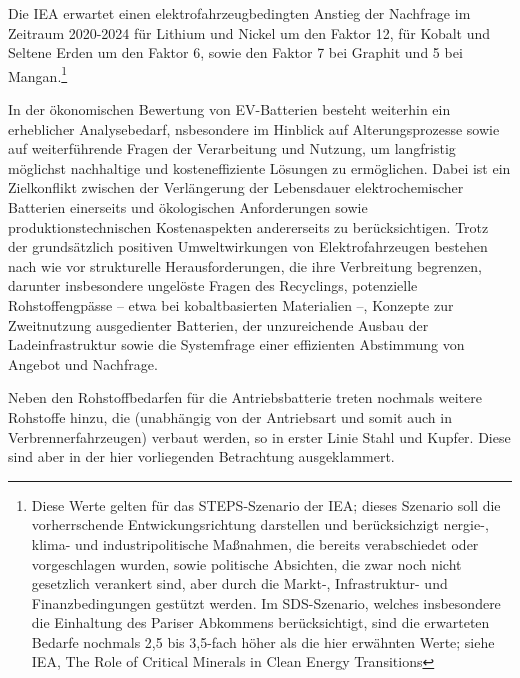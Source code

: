 \documentclass[12pt,a4paper,oneside]{book} %
\begin{document}
{{ 
 Die IEA erwartet einen elektrofahrzeugbedingten Anstieg der Nachfrage im Zeitraum 2020-2024 für Lithium und Nickel um den Faktor 12, für Kobalt und Seltene Erden um den Faktor 6, sowie den Faktor 7 bei Graphit und 5 bei Mangan.\footnote{Diese Werte gelten für das STEPS-Szenario der IEA; dieses Szenario soll die vorherrschende Entwickungsrichtung darstellen und berücksichzigt  nergie-, klima- und industripolitische Maßnahmen, die bereits verabschiedet oder vorgeschlagen wurden, sowie politische Absichten, die zwar noch nicht gesetzlich verankert sind, aber durch die Markt-, Infrastruktur- und Finanzbedingungen gestützt werden. Im SDS-Szenario, welches insbesondere die Einhaltung des Pariser Abkommens berücksichtigt, sind die erwarteten Bedarfe nochmals 2,5 bis 3,5-fach höher als die hier erwähnten Werte; siehe IEA, The Role of Critical Minerals in Clean Energy Transitions}
 
 

In der ökonomischen Bewertung von EV-Batterien besteht weiterhin ein erheblicher Analysebedarf, nsbesondere im Hinblick auf Alterungsprozesse sowie auf weiterführende Fragen der Verarbeitung und Nutzung, um langfristig möglichst nachhaltige und kosteneffiziente Lösungen zu ermöglichen. Dabei ist ein Zielkonflikt zwischen der Verlängerung der Lebensdauer elektrochemischer Batterien einerseits und ökologischen Anforderungen sowie produktionstechnischen Kostenaspekten andererseits zu berücksichtigen. Trotz der grundsätzlich positiven Umweltwirkungen von Elektrofahrzeugen bestehen nach wie vor strukturelle Herausforderungen, die ihre Verbreitung begrenzen, darunter insbesondere ungelöste Fragen des Recyclings, potenzielle Rohstoffengpässe – etwa bei kobaltbasierten Materialien –, Konzepte zur Zweitnutzung ausgedienter Batterien, der unzureichende Ausbau der Ladeinfrastruktur sowie die Systemfrage einer effizienten Abstimmung von Angebot und Nachfrage.\autocite{A comprehensive overview of electric vehicle batteries market, Fazel Mohammadi}

Neben den Rohstoffbedarfen für die Antriebsbatterie treten nochmals weitere Rohstoffe hinzu, die (unabhängig von der Antriebsart und somit auch in Verbrennerfahrzeugen) verbaut werden, so in erster Linie Stahl und Kupfer. Diese sind aber in der hier vorliegenden Betrachtung ausgeklammert.


}}
\end{document}

